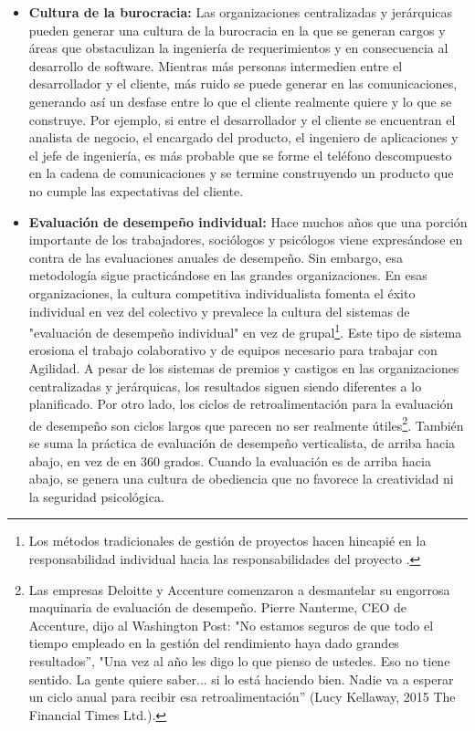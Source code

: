 \begin{itemize}
\item \textbf{Cultura de la burocracia: } 
Las organizaciones centralizadas y jerárquicas pueden generar una cultura de la burocracia en la que se generan cargos y áreas que obstaculizan la ingeniería de requerimientos y en consecuencia al desarrollo de software. Mientras más personas intermedien entre el desarrollador y el cliente, más ruido se puede generar en las comunicaciones, generando así un desfase entre lo que el cliente realmente quiere y lo que se construye. Por ejemplo, si entre el desarrollador y el cliente se encuentran el analista de negocio, el encargado del producto, el ingeniero de aplicaciones y el jefe de ingeniería, es más probable que se forme el teléfono descompuesto en la cadena de comunicaciones y se termine construyendo un producto que no cumple las expectativas del cliente.

\item \textbf{Evaluación de desempeño individual: } 
Hace muchos años que una porción importante de los trabajadores, sociólogos y psicólogos viene expresándose en contra de las evaluaciones anuales de desempeño. Sin embargo, esa metodología sigue practicándose en las grandes organizaciones. En esas organizaciones, la cultura competitiva individualista fomenta el éxito individual en vez del colectivo y prevalece la cultura del sistemas de "evaluación de desempeño individual" en vez de grupal\footnote{Los métodos tradicionales de gestión de proyectos hacen hincapié en la responsabilidad individual hacia las responsabilidades del proyecto \cite{SBOK-2013}.}. Este tipo de sistema erosiona el trabajo colaborativo y de equipos necesario para trabajar con Agilidad. A pesar de los sistemas de premios y castigos en las organizaciones centralizadas y jerárquicas, los resultados siguen siendo diferentes a lo planificado. Por otro lado, los ciclos de retroalimentación para la evaluación de desempeño son ciclos largos que parecen no ser realmente útiles\footnote{Las empresas Deloitte y Accenture  comenzaron a desmantelar su engorrosa maquinaria de evaluación de desempeño. Pierre Nanterme, CEO de Accenture, dijo al Washington Post: "No estamos seguros de que todo el tiempo empleado en la gestión del rendimiento haya dado grandes resultados”, "Una vez al año les digo lo que pienso de ustedes. Eso no tiene sentido. La gente quiere saber... si lo está haciendo bien. Nadie va a esperar un ciclo anual para recibir esa retroalimentación” (Lucy Kellaway, 2015 The Financial Times Ltd.).}. También se  suma la práctica de evaluación de desempeño verticalista, de arriba hacia abajo, en vez de en 360 grados. Cuando la evaluación es de arriba hacia abajo, se genera una cultura de obediencia que no favorece la creatividad ni la seguridad psicológica.

\end{itemize}

